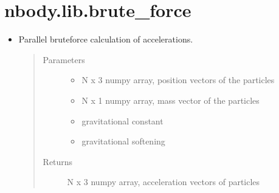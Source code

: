 \documentclass[letterpaper,10pt,english]{sphinxmanual}
\begin{document}
\section{nbody.lib.brute\_force}
\label{\detokenize{brute_force:nbody-lib-brute-force}}\label{\detokenize{brute_force::doc}}\begin{itemize}
\item {} 

\begin{fulllineitems}
\label{\detokenize{brute_force:nbody.lib.brute_force.calculate_accs_pp}}
\sphinxAtStartPar
Parallel brute\sphinxhyphen{}force calculation of accelerations.
\begin{quote}\begin{description}
\item[{Parameters}] \leavevmode\begin{itemize}
\item {} 
\sphinxAtStartPar
{} \textendash{} N x 3 numpy array, position vectors of the particles

\item {} 
\sphinxAtStartPar
{} \textendash{} N x 1 numpy array, mass vector of the particles

\item {} 
\sphinxAtStartPar
{} \textendash{} gravitational constant

\item {} 
\sphinxAtStartPar
{} \textendash{} gravitational softening

\end{itemize}

\item[{Returns}] \leavevmode
\sphinxAtStartPar
N x 3 numpy array, acceleration vectors of particles

\end{description}\end{quote}

\end{fulllineitems}


\end{itemize}
\end{document}
